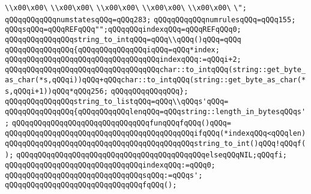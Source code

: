 \verb|\\x00\x00\|\newline
\verb|\\x00\x00\|\newline
\verb|\\x00\x00\|\newline
\verb|\\x00\x00\|\newline
\verb|\\x00\x00\|\newline
\verb|\";|\newline
\verb|qQQqqQQqqQQqnumstatesqQQq=qQQq283;|\newline
\verb|qQQqqQQqqQQqnumrulesqQQq=qQQq155;|\newline
\verb|qQQqsqQQq=qQQqREFqQQq"";qQQqqQQqindexqQQq=qQQqREFqQQq0;|\newline
\verb|qQQqqQQqqQQqqQQqstring_to_intqQQq=qQQq\\qQQq()qQQq=qQQq|\newline
\verb|qQQqqQQqqQQqqQQq{qQQqqQQqqQQqqQQqiqQQq=qQQq*index;|\newline
\verb|qQQqqQQqqQQqqQQqqQQqqQQqqQQqqQQqqQQqindexqQQq:=qQQqi+2;|\newline
\verb|qQQqqQQqqQQqqQQqqQQqqQQqqQQqqQQqqQQqchar::to_intqQQq(string::get_byte_as_char(*s,qQQqi))qQQq+qQQqchar::to_intqQQq(string::get_byte_as_char(*s,qQQqi+1))qQQq*qQQq256;|\newline
\verb|qQQqqQQqqQQqqQQq};|\newline
\newline
\verb|qQQqqQQqqQQqqQQqstring_to_listqQQq=qQQq\\qQQqs'qQQq=|\newline
\verb|qQQqqQQqqQQqqQQq{qQQqqQQqqQQqlenqQQq=qQQqstring::length_in_bytesqQQqs';|\newline
\verb|qQQqqQQqqQQqqQQqqQQqqQQqqQQqqQQqfunqQQqfqQQq()qQQq=|\newline
\verb|qQQqqQQqqQQqqQQqqQQqqQQqqQQqqQQqqQQqqQQqqQQqifqQQq(*indexqQQq<qQQqlen)|\newline
\verb|qQQqqQQqqQQqqQQqqQQqqQQqqQQqqQQqqQQqqQQqqQQqstring_to_int()qQQq!qQQqf();|\newline
\verb|qQQqqQQqqQQqqQQqqQQqqQQqqQQqqQQqqQQqqQQqqQQqelseqQQqNIL;qQQqfi;|\newline
\verb|qQQqqQQqqQQqqQQqqQQqqQQqqQQqqQQqindexqQQq:=qQQq0;|\newline
\verb|qQQqqQQqqQQqqQQqqQQqqQQqqQQqqQQqsqQQq:=qQQqs';|\newline
\verb|qQQqqQQqqQQqqQQqqQQqqQQqqQQqqQQqfqQQq();|\newline
